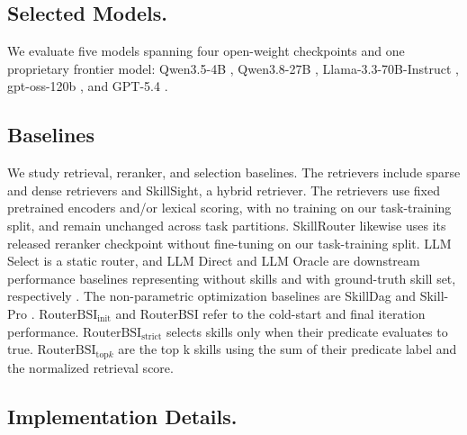 \begin{archivedtables}[!t]\end{archivedtables}

\subsection{Selected Models.}

We evaluate five models spanning four open-weight checkpoints and one proprietary frontier model: Qwen3.5-4B \citep{qwen2026qwen35}, Qwen3.8-27B \citep{qwen2026qwen38}, Llama-3.3-70B-Instruct \citep{meta2024llama33}, gpt-oss-120b \citep{openai2025gptoss}, and GPT-5.4 \citep{openai2026gpt54}.

\subsection{Baselines}

We study retrieval, reranker, and selection baselines. The retrievers include sparse and dense retrievers \citep{su2026skillretrieval} and SkillSight, a hybrid retriever. The retrievers use fixed pretrained encoders and/or lexical scoring, with no training on our task-training split, and remain unchanged across task partitions. SkillRouter likewise uses its released reranker checkpoint without fine-tuning on our task-training split. LLM Select is a static router, and LLM Direct and LLM Oracle are downstream performance baselines representing without skills and with ground-truth skill set, respectively \citep{su2026skillretrieval}. The non-parametric optimization baselines are SkillDag and Skill-Pro \citep{pmlr-v306-mi26d,bai2026skilldag}. $\mathrm{RouterBSI}_{\mathrm{init}}$ and RouterBSI refer to the cold-start and final iteration performance. $\mathrm{RouterBSI}_{\mathrm{strict}}$ selects skills only when their predicate evaluates to true. $\mathrm{RouterBSI}_{\mathrm{top}k}$ are the top k skills using the sum of their predicate label and the normalized retrieval score.

\subsection{Implementation Details.}

